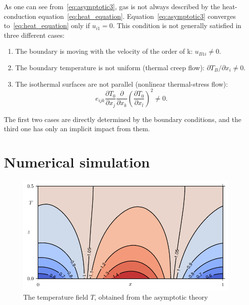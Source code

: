 \documentclass[smallextended, referee]{svjour3} %
\newcommand{\pder}[2][]{\frac{\partial#1}{\partial#2}}
\newcommand{\Pder}[2][]{\partial#1/\partial#2}
\begin{document}
As one can see from~\eqref{eq:asymptotic3}, gas is not always described
by the heat-conduction equation~\eqref{eq:heat_equation}.
Equation~\eqref{eq:asymptotic3} converges to~\eqref{eq:heat_equation} only if \(u_{i1} = 0\).
This condition is not generally satisfied in three different cases:
\begin{enumerate}
	\item The boundary is moving with the velocity of the order of k: \(u_{B1i} \neq 0 \).
	\item The boundary temperature is not uniform (thermal creep flow): \(\Pder[T_B]{x_i} \neq 0 \).
	\item The isothermal surfaces are not parallel (nonlinear thermal-stress flow):
		\begin{equation}\label{eq:equilibrium}
			e_{ijk}\pder[T_0]{x_j}\pder{x_k}\left(\pder[T_0]{x_l}\right)^2 \neq 0.
		\end{equation}
\end{enumerate}

The first two cases are directly determined by the boundary conditions,
and the third one has only an implicit impact from them.

\section{Numerical simulation}

\begin{figure}[ht]
	\centering
	\includegraphics{Fig3}
	\caption{The temperature field \(T\), obtained from the asymptotic theory}
	\label{fig:moving:T_asym}
\end{figure}
\end{document}
